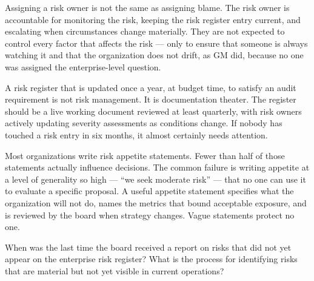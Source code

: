\documentclass[11pt,openany]{book}
\begin{document}
\begin{managerialinsight}
Assigning a risk owner is not the same as assigning blame. The risk owner is accountable for monitoring the risk, keeping the risk register entry current, and escalating when circumstances change materially. They are not expected to control every factor that affects the risk --- only to ensure that someone is always watching it and that the organization does not drift, as GM did, because no one was assigned the enterprise-level question.
\end{managerialinsight}

\begin{commonpitfall}
A risk register that is updated once a year, at budget time, to satisfy an audit requirement is not risk management. It is documentation theater. The register should be a live working document reviewed at least quarterly, with risk owners actively updating severity assessments as conditions change. If nobody has touched a risk entry in six months, it almost certainly needs attention.
\end{commonpitfall}

\begin{whythismatters}
Most organizations write risk appetite statements. Fewer than half of those statements actually influence decisions. The common failure is writing appetite at a level of generality so high --- ``we seek moderate risk'' --- that no one can use it to evaluate a specific proposal. A useful appetite statement specifies what the organization will not do, names the metrics that bound acceptable exposure, and is reviewed by the board when strategy changes. Vague statements protect no one.
\end{whythismatters}

\begin{boardroomquestion}
When was the last time the board received a report on risks that did not yet appear on the enterprise risk register? What is the process for identifying risks that are material but not yet visible in current operations?
\end{boardroomquestion}
\end{document}
